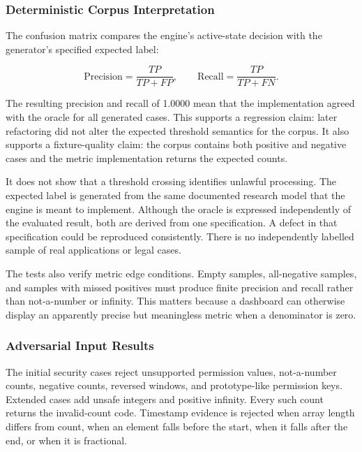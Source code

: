 \subsubsection{Deterministic Corpus Interpretation}

The confusion matrix compares the engine's active-state decision with the generator's specified expected label:

\begin{equation}
\mathrm{Precision}=\frac{TP}{TP+FP}, \qquad
\mathrm{Recall}=\frac{TP}{TP+FN}.
\end{equation}

The resulting precision and recall of 1.0000 mean that the implementation agreed with the oracle for all generated cases. This supports a regression claim: later refactoring did not alter the expected threshold semantics for the corpus. It also supports a fixture-quality claim: the corpus contains both positive and negative cases and the metric implementation returns the expected counts.

It does not show that a threshold crossing identifies unlawful processing. The expected label is generated from the same documented research model that the engine is meant to implement. Although the oracle is expressed independently of the evaluated result, both are derived from one specification. A defect in that specification could be reproduced consistently. There is no independently labelled sample of real applications or legal cases.

The tests also verify metric edge conditions. Empty samples, all-negative samples, and samples with missed positives must produce finite precision and recall rather than not-a-number or infinity. This matters because a dashboard can otherwise display an apparently precise but meaningless metric when a denominator is zero.

\subsubsection{Adversarial Input Results}

The initial security cases reject unsupported permission values, not-a-number counts, negative counts, reversed windows, and prototype-like permission keys. Extended cases add unsafe integers and positive infinity. Every such count returns the invalid-count code. Timestamp evidence is rejected when array length differs from count, when an element falls before the start, when it falls after the end, or when it is fractional.

